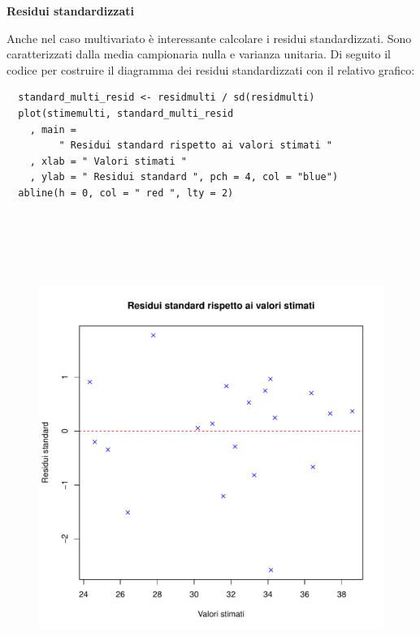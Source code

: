 \noindent \textbf{Residui standardizzati}

Anche nel caso multivariato è interessante calcolare i residui standardizzati. Sono caratterizzati dalla media campionaria nulla e varianza unitaria. Di seguito il codice per costruire il diagramma dei residui standardizzati con il relativo grafico: 

\vspace{5mm}
\begin{lstlisting}
  standard_multi_resid <- residmulti / sd(residmulti)
  plot(stimemulti, standard_multi_resid
    , main =
         " Residui standard rispetto ai valori stimati "
    , xlab = " Valori stimati "
    , ylab = " Residui standard ", pch = 4, col = "blue")
  abline(h = 0, col = " red ", lty = 2)
\end{lstlisting}
\vspace{5mm}

\vspace{5mm}
\begin{figure}[!htbp]
    \centering
    \includegraphics[height=16cm]{ProgettoSAD/capitoli/images/s_desc_biv/residui_standard_multipli.pdf}
\end{figure}
\vspace{5mm}

